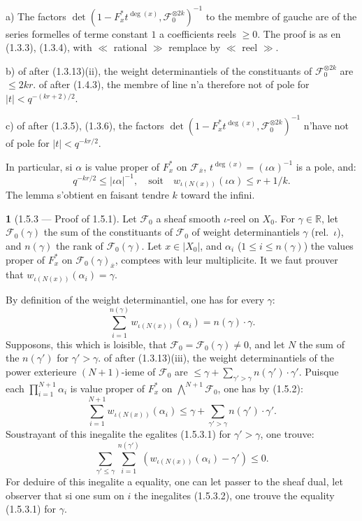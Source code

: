 \documentclass[12pt,a4paper]{article}
\theoremstyle{plain}
\theoremstyle{definition}
\theoremstyle{definition}
\newtheorem{para}{}[section]
\theoremstyle{remark}
\begin{document}
a) The factors $\det(1 - F_x^* t^{\deg(x)}, \mathscr{F}_0^{\otimes 2k})^{-1}$ to the membre of gauche are of the series formelles of terme constant $1$ a coefficients reels $\geq 0$. The proof is as en (1.3.3), (1.3.4), with $\ll$ rational $\gg$ remplace by $\ll$ reel $\gg$.

b) of after (1.3.13)(ii), the weight determinantiels of the constituants of $\mathscr{F}_0^{\otimes 2k}$ are $\leq 2kr$. of after (1.4.3), the membre of line n'a therefore not of pole for $|t| < q^{-(kr+2)/2}$.

c) of after (1.3.5), (1.3.6), the factors $\det(1 - F_x^* t^{\deg(x)}, \mathscr{F}_0^{\otimes 2k})^{-1}$ n'have not of pole for $|t| < q^{-kr/2}$.

In particular, si $\alpha$ is value proper of $F_x^*$ on $\mathscr{F}_{\overline{x}}$, $t^{\deg(x)} = (\iota\alpha)^{-1}$ is a pole, and:
\[q^{-kr/2} \leq |\iota\alpha|^{-1}, \quad \text{soit} \quad w_{\iota(N(x))}(\iota\alpha) \leq r + 1/k.\]
The lemma s'obtient en faisant tendre $k$ toward the infini.

\begin{para}[1.5.3 --- Proof of 1.5.1]
Let $\mathscr{F}_0$ a sheaf smooth $\iota$-reel on $X_0$. For $\gamma \in \mathbb{R}$, let $\mathscr{F}_0(\gamma)$ the sum of the constituants of $\mathscr{F}_0$ of weight determinantiels $\gamma$ (rel.~$\iota$), and $n(\gamma)$ the rank of $\mathscr{F}_0(\gamma)$. Let $x \in |X_0|$, and $\alpha_i$ ($1 \leq i \leq n(\gamma)$) the values proper of $F_x^*$ on $\mathscr{F}_0(\gamma)_{\overline{x}}$, comptees with leur multiplicite. It we faut prouver that $w_{\iota(N(x))}(\alpha_i) = \gamma$.

By definition of the weight determinantiel, one has for every $\gamma$:
\begin{equation}\tag{1.5.3.1}
\sum_{i=1}^{n(\gamma)} w_{\iota(N(x))}(\alpha_i) = n(\gamma) \cdot \gamma.
\end{equation}
Supposons, this which is loisible, that $\mathscr{F}_0 = \mathscr{F}_0(\gamma) \neq 0$, and let $N$ the sum of the $n(\gamma')$ for $\gamma' > \gamma$. of after (1.3.13)(iii), the weight determinantiels of the power exterieure $(N+1)$-ieme of $\mathscr{F}_0$ are $\leq \gamma + \sum_{\gamma' > \gamma} n(\gamma') \cdot \gamma'$. Puisque each $\prod_{i=1}^{N+1} \alpha_i$ is value proper of $F_x^*$ on $\bigwedge^{N+1} \mathscr{F}_0$, one has by (1.5.2):
\[\sum_{i=1}^{N+1} w_{\iota(N(x))}(\alpha_i) \leq \gamma + \sum_{\gamma' > \gamma} n(\gamma') \cdot \gamma'.\]
Soustrayant of this inegalite the egalites (1.5.3.1) for $\gamma' > \gamma$, one trouve:
\begin{equation}\tag{1.5.3.2}
\sum_{\gamma' \leq \gamma} \sum_{i=1}^{n(\gamma')} (w_{\iota(N(x))}(\alpha_i) - \gamma') \leq 0.
\end{equation}
For deduire of this inegalite a equality, one can let passer to the sheaf dual, let observer that si one sum on $i$ the inegalites (1.5.3.2), one trouve the equality (1.5.3.1) for $\gamma$.
\end{para}
\end{document}
